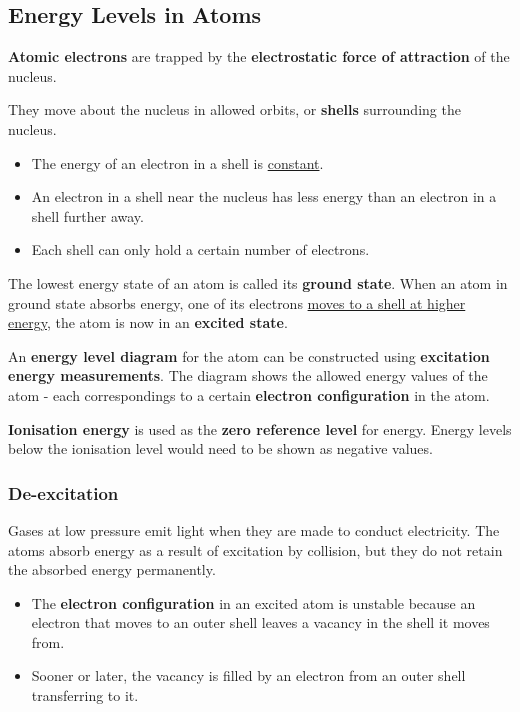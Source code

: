 \subsection{Energy Levels in Atoms}

\textbf{Atomic electrons} are trapped by the \textbf{electrostatic force of attraction} of the nucleus.

They move about the nucleus in allowed orbits, or \textbf{shells} surrounding the nucleus.
\begin{itemize}
    \item The energy of an electron in a shell is \underline{constant}.
    \item An electron in a shell near the nucleus has less energy than an electron in a shell further away.
    \item Each shell can only hold a certain number of electrons.
\end{itemize}

The lowest energy state of an atom is called its \textbf{ground state}. When an atom in ground state absorbs energy, one of its electrons \underline{moves to a shell at higher energy}, the atom is now in an \textbf{excited state}.

An \textbf{energy level diagram} for the atom can be constructed using \textbf{excitation energy measurements}. The diagram shows the allowed energy values of the atom - each correspondings to a certain \textbf{electron configuration} in the atom.

\textbf{Ionisation energy} is used as the \textbf{zero reference level} for energy. Energy levels below the ionisation level would need to be shown as negative values.

\subsubsection*{De-excitation}

Gases at low pressure emit light when they are made to conduct electricity. The atoms absorb energy as a result of excitation by collision, but they do not retain the absorbed energy permanently.

\begin{itemize}
    \item The \textbf{electron configuration} in an excited atom is unstable because an electron that moves to an outer shell leaves a vacancy in the shell it moves from.
    \item Sooner or later, the vacancy is filled by an electron from an outer shell transferring to it.
\end{itemize}

